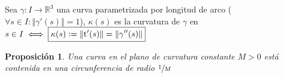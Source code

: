 \documentclass[12pt]{article}
\theoremstyle{plain}
\newtheorem{prop}{Proposición}[subsection]
\newcommand{\R}{\mathbb{R}}
\newcommand{\norm}[1]{\left\Vert#1\right\Vert}
\newcommand{\appl}[3]{#1 \colon #2 \longrightarrow #3}
\newcommand{\defeq}{\vcentcolon=}
\newcommand{\tngnt}{\operatorname{t}}
\renewcommand{\norm}[1]{\left\Vert#1\right\Vert}
\begin{document}
\begin{defn}[Curvatura]
	Sea $\appl{\gamma}{I}{\R^3}$ una curva parametrizada por longitud de arco ($\forall s \in I : \norm{\gamma'(s)}=1$), $\kappa(s)$ es la curvatura de $\gamma$ en $s \in I \iff \boxed{\kappa(s) \defeq \norm{\tngnt'(s)}=\norm{\gamma''(s)}}$
\end{defn}

\begin{ejem}
	
\end{ejem}

\begin{prop}
	Una curva en el plano de curvatura constante $M > 0$ está contenida en una circunferencia de radio $\sfrac{1}{M}$
\end{prop}
\end{document}
